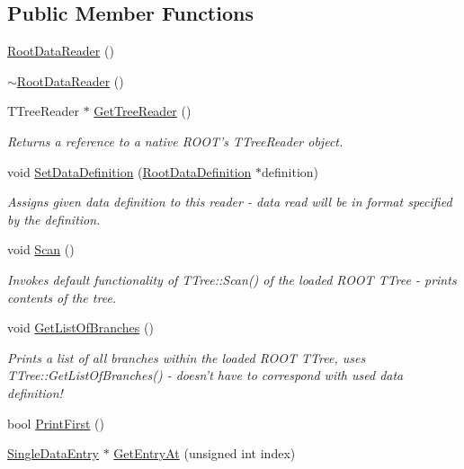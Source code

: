 \subsection*{Public Member Functions}
\begin{DoxyCompactItemize}
\item 
\hyperlink{classRootDataReader_aa06f1264959329cb49e41a7670e6a59f}{Root\+Data\+Reader} ()
\item 
\hyperlink{classRootDataReader_a9f6b5d9e26e27128a445ac3529414f6f}{$\sim$\+Root\+Data\+Reader} ()
\item 
T\+Tree\+Reader $\ast$ \hyperlink{classRootDataReader_a749a090b6c0404f9ff08873a2aef63d7}{Get\+Tree\+Reader} ()
\begin{DoxyCompactList}\small\item\em Returns a reference to a native R\+O\+O\+T's T\+Tree\+Reader object. \end{DoxyCompactList}\item 
void \hyperlink{classRootDataReader_ad670745df69f90ea6578d7c29cab716f}{Set\+Data\+Definition} (\hyperlink{classRootDataDefinition}{Root\+Data\+Definition} $\ast$definition)
\begin{DoxyCompactList}\small\item\em Assigns given data definition to this reader -\/ data read will be in format specified by the definition. \end{DoxyCompactList}\item 
void \hyperlink{classRootDataReader_a22eac63f0710d5cce4a1d0a16210ce8f}{Scan} ()
\begin{DoxyCompactList}\small\item\em Invokes default functionality of T\+Tree\+::\+Scan() of the loaded R\+O\+O\+T T\+Tree -\/ prints contents of the tree. \end{DoxyCompactList}\item 
void \hyperlink{classRootDataReader_ad09cfc44c2075d7e7dee819460718f1e}{Get\+List\+Of\+Branches} ()
\begin{DoxyCompactList}\small\item\em Prints a list of all branches within the loaded R\+O\+O\+T T\+Tree, uses T\+Tree\+::\+Get\+List\+Of\+Branches() -\/ doesn't have to correspond with used data definition! \end{DoxyCompactList}\item 
bool \hyperlink{classRootDataReader_aac09b1313c7ce2c180b5efede781eef6}{Print\+First} ()
\item 
\hyperlink{classSingleDataEntry}{Single\+Data\+Entry} $\ast$ \hyperlink{classRootDataReader_abd5fbaefe8631cf251e9aeade874fa5d}{Get\+Entry\+At} (unsigned int index)

\end{DoxyCompactItemize}
